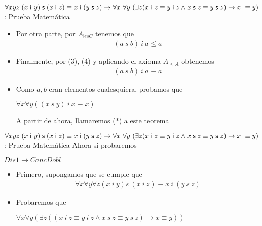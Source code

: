 \documentclass[10pt]{beamer}
\newcommand{\Cfonti}{\fontsize{8.5}{7.2}\selectfont}
\newcommand{\Nanti}{{A}_{\leq A}}
\newcommand{\NiCot}{{A}_{\mathsf{i}esC}}
\newcommand{\acot}{Dis1\rightarrow CancDobl}
\newcommand{\idistr}{\forall xyz\;(x\;\mathsf{i}\
y)\;\mathsf{s}\;(x\;\mathsf{i}\;z)\equiv x\;\mathsf{i}\;(y\;\mathsf{s}%
\;z)}
\newcommand{\myconj}{x\;\mathsf{i}\;z\equiv y\;\mathsf{%
i}\;z\wedge x\;\mathsf{s}\;z\equiv y\;\mathsf{s}\;z}
\begin{document}
\begin{frame}{\Cfonti$\idistr \rightarrow \forall x\ \forall y\ (\exists z (\myconj) \rightarrow x\ \equiv y)$:
   Prueba Matemática}
  \begin{itemize}[<+->]
    \item Por otra parte, por $\NiCot$ tenemos que
    \begin{align}
      (a\ s\ b)\ i\ a \leq a \label{eq11}
    \end{align}

    \item Finalmente, por (3), (4) y aplicando el axioma $\Nanti$ obtenemos
    \begin{align}
      (a\ s\ b)\ i\ a \equiv a \label{eq11}
    \end{align}
    \item Como $a, b$ eran elementos cualesquiera, probamos que
    \begin{center}
      $\forall x \forall y ((x\ s\ y)\ i\ x \equiv x)$
    \end{center}
    A partir de ahora, llamaremos ($*$) a este teorema
  \end{itemize}
\end{frame}


\begin{frame}{\Cfonti$\idistr \rightarrow \forall x\ \forall y\ (\exists z (\myconj) \rightarrow x\ \equiv y)$:
   Prueba Matemática}
  Ahora si probaremos
  \begin{center}
    $\acot$
  \end{center}
  \pause
  \begin{itemize}[<+->]

    \item Primero, supongamos que se cumple que
    \begin{align}
      \forall x \forall y \forall z (x\ i\ y) s\ (x\ i\ z) \equiv x\ i\ (y\ s\ z) \label{eq11}
    \end{align}
    \item Probaremos que
    \begin{center}
      $\forall x \forall y (\exists z ((x\ i\ z \equiv y\ i\ z \wedge x\ s\ z \equiv y\ s\ z) \rightarrow x \equiv y))$
    \end{center}

  \end{itemize}
\end{frame}
\end{document}
